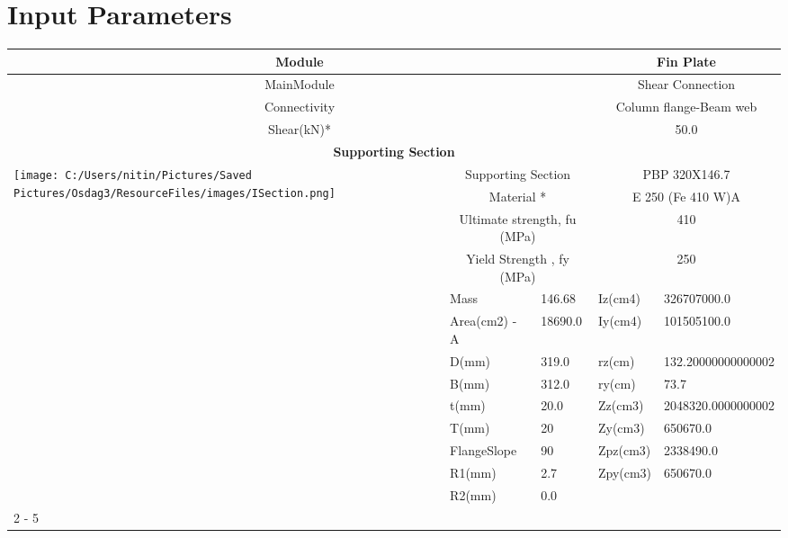 \documentclass{article}%
\begin{document}
%
\normalsize%
\pagestyle{header}%
\section{Input Parameters}%
\label{sec:InputParameters}%
\renewcommand{\arraystretch}{1.2}%
\begin{longtable}{|p{5cm}|p{2cm}|p{2cm}|p{2cm}|p{5cm}|}%
\hline%
\hline%
\multicolumn{3}{|c|}{Module}&\multicolumn{2}{|c|}{Fin Plate}\\%
\hline%
\hline%
\multicolumn{3}{|c|}{MainModule}&\multicolumn{2}{|c|}{Shear Connection}\\%
\hline%
\hline%
\multicolumn{3}{|c|}{Connectivity}&\multicolumn{2}{|c|}{Column flange{-}Beam web}\\%
\hline%
\hline%
\multicolumn{3}{|c|}{Shear(kN)*}&\multicolumn{2}{|c|}{50.0}\\%
\hline%
\hline%
\multicolumn{5}{|c|}{\textbf{Supporting Section}}\\%
\hline%
\hline%
\multirow{13}{*}{\texttt{[image: C:/Users/nitin/Pictures/Saved Pictures/Osdag3/ResourceFiles/images/ISection.png]}}&\multicolumn{2}{|c|}{Supporting Section}&\multicolumn{2}{|c|}{PBP 320X146.7}\\%
\cline{2%
-%
5}%
&\multicolumn{2}{|c|}{Material *}&\multicolumn{2}{|c|}{E 250 (Fe 410 W)A}\\%
\cline{2%
-%
5}%
&\multicolumn{2}{|c|}{Ultimate strength, fu (MPa)}&\multicolumn{2}{|c|}{410}\\%
\cline{2%
-%
5}%
&\multicolumn{2}{|c|}{Yield Strength , fy (MPa)}&\multicolumn{2}{|c|}{250}\\%
\cline{2%
-%
5}%
&Mass&146.68&Iz(cm4)&326707000.0\\%
\cline{2%
-%
5}%
&Area(cm2) {-} A&18690.0&Iy(cm4)&101505100.0\\%
\cline{2%
-%
5}%
&D(mm)&319.0&rz(cm)&132.20000000000002\\%
\cline{2%
-%
5}%
&B(mm)&312.0&ry(cm)&73.7\\%
\cline{2%
-%
5}%
&t(mm)&20.0&Zz(cm3)&2048320.0000000002\\%
\cline{2%
-%
5}%
&T(mm)&20&Zy(cm3)&650670.0\\%
\cline{2%
-%
5}%
&FlangeSlope&90&Zpz(cm3)&2338490.0\\%
\cline{2%
-%
5}%
&R1(mm)&2.7&Zpy(cm3)&650670.0\\%
\cline{2%
-%
5}%
&R2(mm)&0.0&&\\%
\cline{2%
-%
5}%
\hline%
\multicolumn{5}{|c|}{\textbf{Supported Section}}\\%

\end{longtable}
\end{document}
